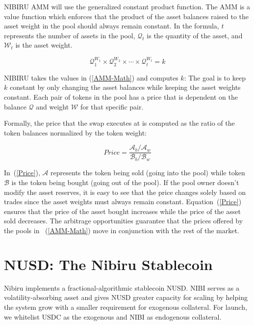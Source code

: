 \documentclass[11pt]{article}
\begin{document}
NIBIRU AMM will use the generalized constant product function. The AMM is a value function which enforces that the product of the asset balances raised to the asset weight in the pool should always remain constant. In the formula, $t$ represents the number of assets in the pool, $\mathcal{Q}_t$ is the quantity of the asset, and $\mathcal{W}_t$ is the asset weight. 

\begin{equation}
\mathcal{Q}_1^{W_1} \times \mathcal{Q}_2^{W_2} \times \cdots \times \mathcal{Q}_t^{W_t} = k
\label{AMM-Math}
\end{equation}

NIBIRU takes the values in (\ref{AMM-Math}) and computes $k$: The goal is to keep $k$ constant by only changing the asset balances while keeping the asset weights constant. 
Each pair of tokens in the pool has a price that is dependent on the balance $\mathcal{Q}$ and weight $\mathcal{W}$ for that specific pair. 

Formally, the price that the swap executes at is computed as the ratio of the token balances normalized by the token weight:

\begin{equation}
Price = \frac{\mathcal{A}_b/\mathcal{A}_w}{\mathcal{B}_b/\mathcal{B}_w}
\label{Price}
\end{equation}
 
In~(\ref{Price}), $\mathcal{A}$ represents the token being sold (going into the pool) while token $\mathcal{B}$ is the token being bought (going out of the pool). If the pool owner doesn’t modify the asset reserves, it is easy to see that the price changes solely based on trades since the asset weights must always remain constant. Equation~(\ref{Price}) ensures that the price of the asset bought increases while the price of the asset sold decreases. The arbitrage opportunities guarantee that the prices offered by the pools in ~(\ref{AMM-Math}) move in conjunction with the rest of the market.

\part{NUSD: The Nibiru Stablecoin}


Nibiru implements a fractional-algorithmic stablecoin NUSD. NIBI serves as a volatility-absorbing asset and gives NUSD greater capacity for scaling by helping the system grow with a smaller requirement for exogenous collateral. For launch, we whitelist USDC as the exogenous and NIBI as endogenous collateral.
\end{document}

